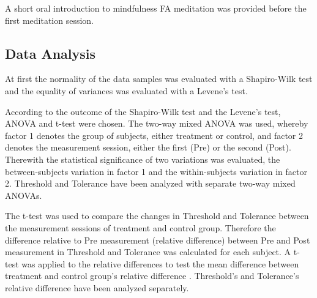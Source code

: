 A short oral introduction to mindfulness FA meditation was provided before the first meditation session. 

\subsection{Data Analysis}

At first the normality of the data samples was evaluated with a Shapiro-Wilk test and the equality of variances was evaluated with a Levene's test. 

According to the outcome of the Shapiro-Wilk test and the Levene’s test, ANOVA and t-test were chosen. The two-way mixed ANOVA was used, whereby factor 1 denotes the group of subjects, either treatment or control, and factor 2 denotes the measurement session, either the first (Pre) or the second (Post). Therewith the statistical significance of two variations was evaluated, the between-subjects variation in factor 1 and the within-subjects variation in factor 2. \cite{Mooi2018} Threshold and Tolerance have been analyzed with separate two-way mixed ANOVAs.

The t-test was used to compare the changes in Threshold and Tolerance between the measurement sessions of treatment and control group. Therefore the difference relative to Pre measurement (relative difference) between Pre and Post measurement in Threshold and Tolerance was calculated for each subject. A t-test was applied to the relative differences to test the mean difference between treatment and control group’s relative difference \cite{Mooi2018}. Threshold's and Tolerance's relative difference have been analyzed separately.


